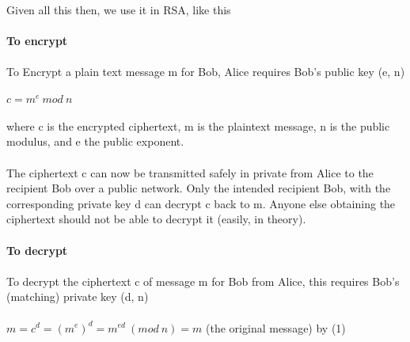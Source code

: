 \documentclass[11pt]{article}   	%
\begin{document}
\\
Given all this then, we use it in RSA, like this \\
\\
\textbf{To encrypt} \\
\\
To Encrypt a plain text message m for Bob, Alice requires Bob's public key (e, n) \\
\\
$ c = m^e \ mod \ n $ \\
\\
where c is the encrypted ciphertext, m is the plaintext message, n is the public modulus, and e the public exponent. \\
\\
The ciphertext c can now be transmitted safely in private from Alice to the recipient Bob over a public network. Only the intended recipient Bob, with the corresponding private key d can decrypt c back to m. Anyone else obtaining the ciphertext should not be able to decrypt it (easily, in theory). \\
\\
\textbf{To decrypt} \\
\\
To decrypt the ciphertext c of message m for Bob from Alice, this requires Bob's (matching) private key (d, n) \\
\\
$ m = c^d = (m^e)^d = m^{ed} \ (mod \ n) = m$ (the original message) by (1) \\

\break 
\end{document}
